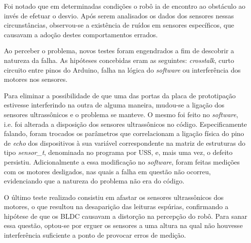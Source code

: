 Foi notado que em determinadas condições o robô ia de encontro ao obstáculo ao invés de efetuar o desvio. 
Após serem analisados os dados dos sensores nessas circunstâncias, observou-se a existência de ruídos em sensores específicos, que causavam a adoção 
destes comportamentos errados.

Ao perceber o problema, novos testes foram engendrados a fim de descobrir a natureza da falha.
As hipóteses concebidas eram as seguintes: \textit{crosstalk}, curto circuito entre pinos do Arduino, falha na lógica do \textit{software} ou 
interferência dos motores nos sensores.

Para eliminar a possibilidade de que uma das portas da placa de prototipação estivesse interferindo na outra de alguma maneira, mudou-se a 
ligação dos sensores ultrassônicos e o problema se manteve.
O mesmo foi feito no \textit{software}, i.e. foi alterada a disposição dos sensores ultrassônicos no código. 
Especificamente falando, foram trocados os parâmetros que correlacionam a ligação física do pino de \textit{echo} dos dispositivos à sua variável 
correspondente na matriz de estruturas do tipo \textit{sensor\_t}, denominada no programa por USS, e, mais uma vez, o defeito persistiu.
Adicionalmente a essa modificação no \textit{software}, foram feitas medições com os motores desligados, nas quais a falha em questão não ocorreu, 
evidenciando que a natureza do problema não era do código.

O último teste realizado consistiu em afastar os sensores ultrassônicos dos motores, o que resultou na desaparição das leituras espúrias, confirmando 
a hipótese de que os BLDC causavam a distorção na percepção do robô.
Para sanar essa questão, optou-se por erguer os sensores a uma altura na qual não houvesse interferência suficiente a ponto de provocar erros de 
medição.